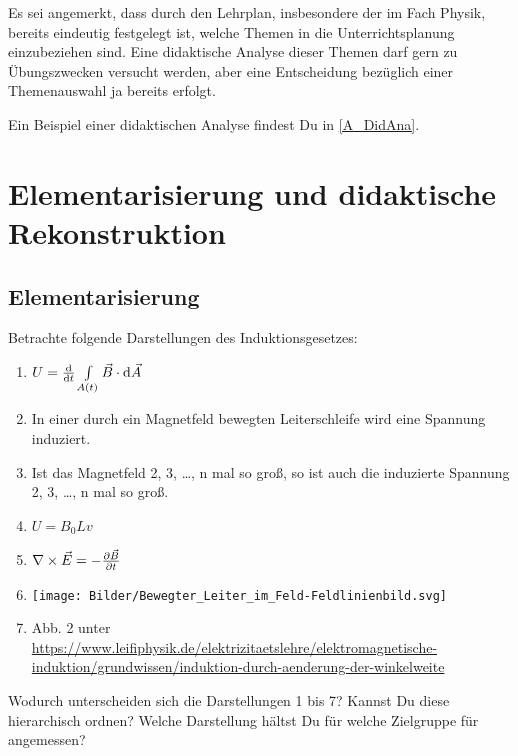 \bip

Es sei angemerkt, dass durch den Lehrplan, insbesondere der im Fach Physik, bereits eindeutig festgelegt ist, welche Themen in die Unterrichtsplanung einzubeziehen sind. Eine didaktische Analyse dieser Themen darf gern zu \"{U}bungszwecken versucht werden, aber eine Entscheidung bez\"{u}glich einer Themenauswahl ja bereits erfolgt.

Ein Beispiel einer didaktischen Analyse findest Du in \cref{A_DidAna}.

\section{Elementarisierung und didaktische Rekonstruktion}


\subsection{Elementarisierung}\label{Elementarisierung}

\begin{uea}
	Betrachte folgende Darstellungen des Induktionsgesetzes:
	\begin{enumerate}
		\item $U = \dv{t} \int\limits_{A(t)} \vec{B}\cdot \dd{\vec{A}}$
		\item In einer durch ein Magnetfeld bewegten Leiterschleife wird eine Spannung induziert.
		\item Ist das Magnetfeld 2, 3, \dots, n mal so groß, so ist auch die induzierte Spannung 2, 3, \dots, n mal so groß.
		\item $U=B_0 L v$
		\item $\nabla\times\vec{E} = - \pdv{\vec{B}}{t}$
		\item \texttt{[image: Bilder/Bewegter\_Leiter\_im\_Feld-Feldlinienbild.svg]}
		\item Abb. 2 unter \url{https://www.leifiphysik.de/elektrizitaetslehre/elektromagnetische-induktion/grundwissen/induktion-durch-aenderung-der-winkelweite}
	\end{enumerate}
	Wodurch unterscheiden sich die Darstellungen 1 bis 7? Kannst Du diese hierarchisch ordnen? Welche Darstellung hältst Du für welche Zielgruppe für angemessen?
\end{uea}

